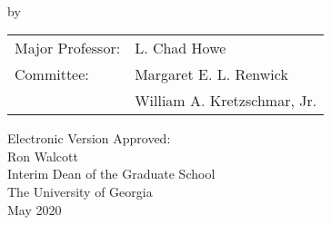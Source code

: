 \setcounter{page}{3}

\vspace*{18pt}
\begin{center}
  \textsc{\dissertationtitle}\\[18pt]
  by\\[18pt]
  \textsc{\myname}
\end{center}
\vfill

\begin{flushright}
  \begin{tabular}{ll}
    Major Professor: & L. Chad Howe \\ [8pt]
    Committee: & Margaret E. L. Renwick \\
    & William A. Kretzschmar, Jr. \\
  \end{tabular}
\end{flushright}

\vspace*{3cm}

\begin{flushleft}
  Electronic Version Approved:\\[12pt]
  Ron Walcott\\
  Interim Dean of the Graduate School\\
  The University of Georgia\\
  May 2020
\end{flushleft}
\vspace*{1.5cm}
